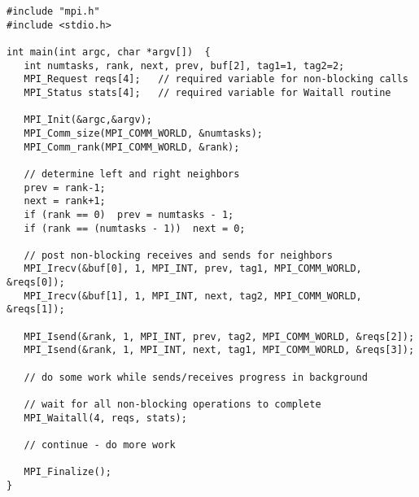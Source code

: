 \documentclass[11pt,a4paper]{article}
\begin{document}
\begin{lstlisting}[style=customcpp]
#include "mpi.h"
#include <stdio.h>

int main(int argc, char *argv[])  {
   int numtasks, rank, next, prev, buf[2], tag1=1, tag2=2;
   MPI_Request reqs[4];   // required variable for non-blocking calls
   MPI_Status stats[4];   // required variable for Waitall routine

   MPI_Init(&argc,&argv);
   MPI_Comm_size(MPI_COMM_WORLD, &numtasks);
   MPI_Comm_rank(MPI_COMM_WORLD, &rank);
   
   // determine left and right neighbors
   prev = rank-1;
   next = rank+1;
   if (rank == 0)  prev = numtasks - 1;
   if (rank == (numtasks - 1))  next = 0;

   // post non-blocking receives and sends for neighbors
   MPI_Irecv(&buf[0], 1, MPI_INT, prev, tag1, MPI_COMM_WORLD, &reqs[0]);
   MPI_Irecv(&buf[1], 1, MPI_INT, next, tag2, MPI_COMM_WORLD, &reqs[1]);

   MPI_Isend(&rank, 1, MPI_INT, prev, tag2, MPI_COMM_WORLD, &reqs[2]);
   MPI_Isend(&rank, 1, MPI_INT, next, tag1, MPI_COMM_WORLD, &reqs[3]);
  
   // do some work while sends/receives progress in background

   // wait for all non-blocking operations to complete
   MPI_Waitall(4, reqs, stats);
  
   // continue - do more work

   MPI_Finalize();
}
\end{lstlisting}
\end{document}
